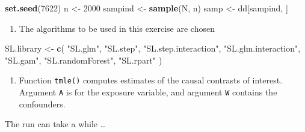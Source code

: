 \documentclass[
]{book}
\newenvironment{Shaded}{\begin{snugshade}}{\end{snugshade}}
\newcommand{\AttributeTok}[1]{\textcolor[rgb]{0.13,0.29,0.53}{#1}}
\newcommand{\DecValTok}[1]{\textcolor[rgb]{0.00,0.00,0.81}{#1}}
\newcommand{\FunctionTok}[1]{\textcolor[rgb]{0.13,0.29,0.53}{\textbf{#1}}}
\newcommand{\NormalTok}[1]{#1}
\newcommand{\OtherTok}[1]{\textcolor[rgb]{0.56,0.35,0.01}{#1}}
\newcommand{\SpecialCharTok}[1]{\textcolor[rgb]{0.81,0.36,0.00}{\textbf{#1}}}
\newcommand{\StringTok}[1]{\textcolor[rgb]{0.31,0.60,0.02}{#1}}
\providecommand{\tightlist}{%
  \setlength{\itemsep}{0pt}\setlength{\parskip}{0pt}}
\begin{document}
\begin{Shaded}
\begin{Highlighting}[]
\FunctionTok{set.seed}\NormalTok{(}\DecValTok{7622}\NormalTok{)}
\NormalTok{n }\OtherTok{\textless{}{-}} \DecValTok{2000}
\NormalTok{sampind }\OtherTok{\textless{}{-}} \FunctionTok{sample}\NormalTok{(N, n)}
\NormalTok{samp }\OtherTok{\textless{}{-}}\NormalTok{ dd[sampind, ]}
\end{Highlighting}
\end{Shaded}

\begin{enumerate}
\def\labelenumi{\arabic{enumi}.}
\setcounter{enumi}{1}
\tightlist
\item
  The algorithms to be used in this exercise are chosen
\end{enumerate}

\begin{Shaded}
\begin{Highlighting}[]
\NormalTok{SL.library }\OtherTok{\textless{}{-}} \FunctionTok{c}\NormalTok{(}
  \StringTok{"SL.glm"}\NormalTok{, }\StringTok{"SL.step"}\NormalTok{, }\StringTok{"SL.step.interaction"}\NormalTok{,}
  \StringTok{"SL.glm.interaction"}\NormalTok{, }\StringTok{"SL.gam"}\NormalTok{,}
  \StringTok{"SL.randomForest"}\NormalTok{, }\StringTok{"SL.rpart"}
\NormalTok{)}
\end{Highlighting}
\end{Shaded}

\begin{enumerate}
\def\labelenumi{\arabic{enumi}.}
\setcounter{enumi}{2}
\tightlist
\item
  Function \texttt{tmle()} computes estimates of the causal contrasts of interest.
  Argument \texttt{A} is for the exposure variable, and
  argument \texttt{W} contains the confounders.
\end{enumerate}

The run can take a while \ldots{}

\begin{Shaded}
\end{Shaded}
\end{document}
